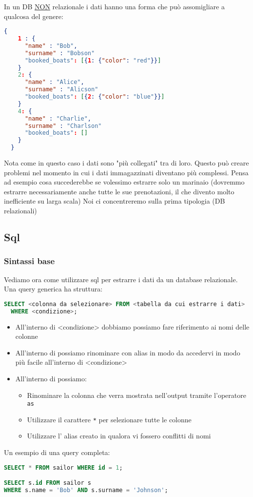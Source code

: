 In un DB \underline{NON} relazionale i dati hanno una forma che può assomigliare a qualcosa del genere:
\begin{lstlisting}[language = JSON, frame = none]
  {
    1 : {
      "name" : "Bob",
      "surname" : "Bobson"
      "booked_boats": [{1: {"color": "red"}}]
    }
    2: {
      "name" : "Alice",
      "surname" : "Alicson"
      "booked_boats": [{2: {"color": "blue"}}]
    }
    4: {
      "name" : "Charlie",
      "surname" : "Charlson"
      "booked_boats": []
    }
  } 
\end{lstlisting}

Nota come in questo caso i dati sono "più collegati" tra di loro. Questo può creare problemi nel momento in cui i dati immagazzinati diventano più complessi. Pensa ad esempio cosa succederebbe se volessimo estrarre solo un marinaio (dovremmo estrarre necessariamente anche tutte le sue prenotazioni, il che divento molto inefficiente su larga scala)
\vskip3mm
Noi ci concentreremo sulla prima tipologia (DB relazionali)

\subsection{Sql}
\subsubsection{Sintassi base}
Vediamo ora come utilizzare sql per estrarre i dati da un database relazionale. Una query generica ha struttura:
\begin{lstlisting}[language = SQL, style = SQL, frame = none]
  SELECT <colonna da selezionare> FROM <tabella da cui estrarre i dati> 
  WHERE <condizione>;
\end{lstlisting}

\begin{itemize}
	\item All'interno di {\ttfamily <condizione>} dobbiamo possiamo fare riferimento ai nomi delle colonne
	\item All'interno di {\ttfamily <tabella da cui estrarre i dati>} possiamo rinominare con alias in modo da accedervi in modo più facile all'interno di {\ttfamily <condizione>}
	\item All'interno di {\ttfamily <colonna da selezionare>} possiamo:
	      \begin{itemize}
		      \item Rinominare la colonna che verra mostrata nell'output tramite l'operatore \verb|as|
		      \item Utilizzare il carattere \verb|*| per selezionare tutte le colonne
		      \item Utilizzare l' alias creato in {\ttfamily <tabella da cui estrarre i dati>} qualora vi fossero conflitti di nomi
	      \end{itemize}
\end{itemize}
Un esempio di una query completa:
\begin{lstlisting}[language = SQL, style = SQL, frame = none]
SELECT * FROM sailor WHERE id = 1;

SELECT s.id FROM sailor s 
WHERE s.name = 'Bob' AND s.surname = 'Johnson';
\end{lstlisting}

